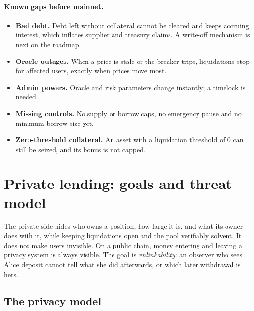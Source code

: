 \documentclass[11pt,a4paper]{article}
\begin{document}
\paragraph{Known gaps before mainnet.}\label{sec:gaps}
\begin{itemize}
  \item \textbf{Bad debt.} Debt left without collateral cannot be cleared and keeps accruing interest, which
        inflates supplier and treasury claims. A write-off mechanism is next on the roadmap.
  \item \textbf{Oracle outages.} When a price is stale or the breaker trips, liquidations stop for affected
        users, exactly when prices move most.
  \item \textbf{Admin powers.} Oracle and risk parameters change instantly; a timelock is needed.
  \item \textbf{Missing controls.} No supply or borrow caps, no emergency pause and no minimum borrow size yet.
  \item \textbf{Zero-threshold collateral.} An asset with a liquidation threshold of 0 can still be seized, and
        its bonus is not capped.
\end{itemize}

\section{Private lending: goals and threat model}

The private side hides who owns a position, how large it is, and what its owner does with it, while keeping
liquidations open and the pool verifiably solvent. It does not make users invisible. On a public chain, money
entering and leaving a privacy system is always visible. The goal is \emph{unlinkability}: an observer who sees
Alice deposit cannot tell what she did afterwards, or which later withdrawal is hers.

\subsection{The privacy model}
\label{sec:privmodel}
\end{document}
